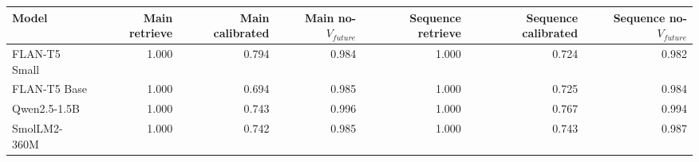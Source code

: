\begin{tabular}{lrrrrrr}
\toprule
Model & Main retrieve & Main calibrated & Main no-$V_{future}$ & Sequence retrieve & Sequence calibrated & Sequence no-$V_{future}$ \\
\midrule
FLAN-T5 Small & 1.000 & 0.794 & 0.984 & 1.000 & 0.724 & 0.982 \\
FLAN-T5 Base & 1.000 & 0.694 & 0.985 & 1.000 & 0.725 & 0.984 \\
Qwen2.5-1.5B & 1.000 & 0.743 & 0.996 & 1.000 & 0.767 & 0.994 \\
SmolLM2-360M & 1.000 & 0.742 & 0.985 & 1.000 & 0.743 & 0.987 \\
\bottomrule
\end{tabular}
